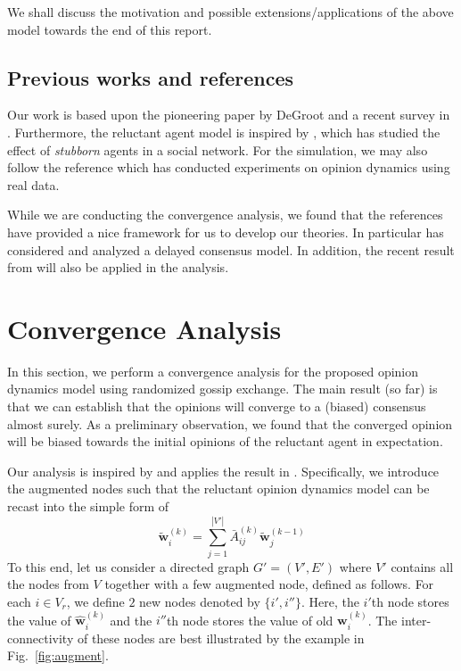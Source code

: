 \documentclass[letter]{article}
\theoremstyle{remark}
\begin{document}
We shall discuss the motivation and possible extensions/applications of the above model towards the end of this report.


\subsection{Previous works and references} 
Our work is based upon the pioneering paper by DeGroot \cite{Degroot_74} and a recent survey in \cite{Fagnani2014}. Furthermore, the reluctant agent model is inspired by \cite{Acemoglu2013}, which has studied the effect of \emph{stubborn} agents in a social network. For the simulation, we may also follow the reference \cite{Das2014} which has conducted experiments on opinion dynamics using real data. 

While we are conducting the convergence analysis, we found that the references \cite{Nedic2010} have provided a nice framework for us to develop our theories. In particular \cite{Nedic2010} has considered and analyzed a delayed consensus model. In addition, the recent result from \cite{Touri2014} will also be applied in the analysis. 




\section{Convergence Analysis} 
In this section, we perform a convergence analysis for the proposed opinion dynamics model using randomized gossip exchange. 
The main result (so far) is that we can establish that the opinions will  converge to a (biased) consensus almost surely. 
As a preliminary observation, we found that the converged opinion will be biased towards the initial opinions of the reluctant agent in expectation. 

Our analysis is inspired by \cite{Nedic2010} and applies the result in \cite{Touri2014}. Specifically, we introduce the augmented nodes such that the reluctant opinion dynamics model can be recast into the simple form of 
\[
\tilde{\bm w}_i^{(k)} = \sum_{j=1}^{|V'|} \bar{A}_{ij}^{(k)} \tilde{\bm w}_j^{(k-1)}
\]
To this end, let us consider a directed graph $G' = (V',E')$ where $V'$ contains all the nodes from $V$ together with a few augmented node, defined as follows. For each $i \in V_r$, we define $2$ new nodes denoted by $\{ i', i'' \}$. Here, the $i'$th node stores the value of $\hat{\bm w}_i^{(k)}$ and the $i''$th node stores the value of old ${\bm w}_i^{(k)}$. The inter-connectivity of these nodes are best illustrated by the example in Fig.~\ref{fig:augment}. 
\end{document}
